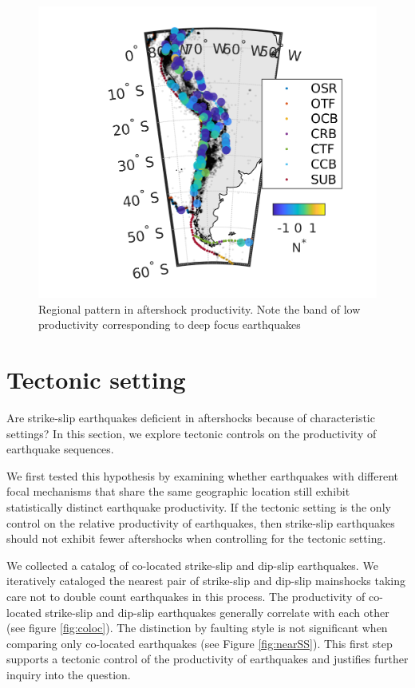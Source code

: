 \documentclass[12pt, notitlepage]{report}
\begin{document}
\begin{figure}
    \centering
    \includegraphics[]{figures/south_america.png}
    \caption{Regional pattern in aftershock productivity. Note the band of low productivity corresponding to deep focus earthquakes}
    \label{fig:atacama}
\end{figure}

\section{Tectonic setting}\label{sec:tectonic_setting}

Are strike-slip earthquakes deficient in aftershocks because of characteristic settings? In this section, we explore tectonic controls on the productivity of earthquake sequences.

We first tested this hypothesis by examining whether earthquakes with different focal mechanisms that share the same geographic location still exhibit statistically distinct earthquake productivity. If the tectonic setting is the only control on the relative productivity of earthquakes, then strike-slip earthquakes should not exhibit fewer aftershocks when controlling for the tectonic setting. 

We collected a catalog of co-located strike-slip and dip-slip earthquakes. We iteratively cataloged the nearest pair of strike-slip and dip-slip mainshocks taking care not to double count earthquakes in this process. The productivity of co-located strike-slip and dip-slip earthquakes generally correlate with each other (see figure \ref{fig:coloc}). The distinction by faulting style is not significant when comparing only co-located earthquakes (see Figure \ref{fig:nearSS}). This first step supports a tectonic control of the productivity of earthquakes and justifies further inquiry into the question.
\end{document}
